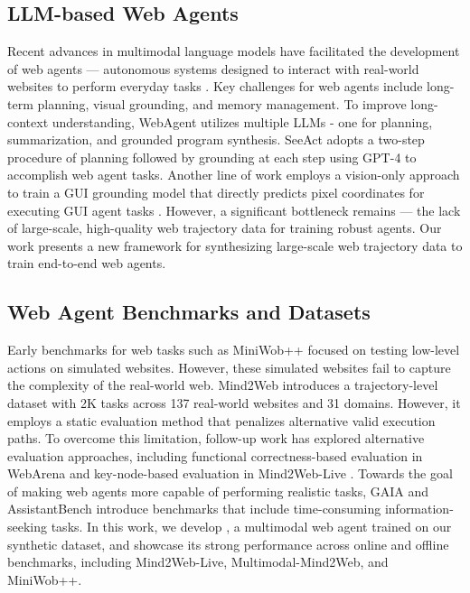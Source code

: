 \subsection{LLM-based Web Agents}


Recent advances in multimodal language models have facilitated the development of web agents — autonomous systems designed to interact with real-world websites to perform everyday tasks \cite{mind2web, cogagent, seeclick, zheng2024gpt}.
Key challenges for web agents include long-term planning, visual grounding, and memory management. 
To improve long-context understanding, WebAgent \cite{DBLP:conf/iclr/GurFHSMEF24} utilizes multiple LLMs - one for planning, summarization, and grounded program synthesis.
SeeAct \cite{zheng2024gpt} adopts a two-step procedure of planning followed by grounding at each step using GPT-4 to accomplish web agent tasks.
Another line of work employs a vision-only approach to train a GUI grounding model that directly predicts pixel coordinates for executing GUI agent tasks \cite{seeclick, DBLP:conf/eccv/KapoorBRKKAS24, gou2024uground}.
However, a significant bottleneck remains — the lack of large-scale, high-quality web trajectory data for training robust agents. 
Our work presents a new framework for synthesizing large-scale web trajectory data to train end-to-end web agents.



\subsection{Web Agent Benchmarks and Datasets}
Early benchmarks for web tasks such as MiniWob++ \cite{miniwob} focused on testing low-level actions on simulated websites. 
However, these simulated websites fail to capture the complexity of the real-world web.
Mind2Web \cite{mind2web} introduces a trajectory-level dataset with 2K tasks across 137 real-world websites and 31 domains.
However, it employs a static evaluation method that penalizes alternative valid execution paths.
To overcome this limitation, follow-up work has explored alternative evaluation approaches, including functional correctness-based evaluation in WebArena \cite{DBLP:conf/iclr/ZhouX0ZLSCOBF0N24} and key-node-based evaluation in Mind2Web-Live \cite{pan2024webcanvas}.
Towards the goal of making web agents more capable of performing realistic tasks, GAIA \cite{mialon2024gaia} and AssistantBench \cite{DBLP:conf/emnlp/YoranAMBPB24} introduce benchmarks that include time-consuming information-seeking tasks.
In this work, we develop \model, a multimodal web agent trained on our synthetic dataset, and showcase its strong performance across online and offline benchmarks, including Mind2Web-Live, Multimodal-Mind2Web, and MiniWob++.


